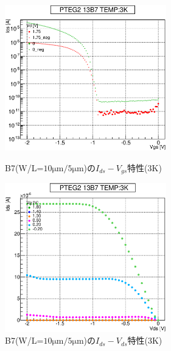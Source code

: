 				\begin{figure}[htbp]
					\begin{minipage}{0.5\hsize}
						\begin{center}
							\includegraphics[width=70mm]{./Chapter/Appendix/Picture/PBT/B7/PTEG2_13_B7_IdVg_3K.eps}
						\end{center}
						\caption{B7(W/L=$10\mathrm{\mu m}/5\mathrm{\mu m}$)の$I_{ds}-V_{gs}$特性(3K)}
						\label{fig:B7_IdVg_3K}
					\end{minipage}
					\begin{minipage}{0.5\hsize}
						\begin{center}
							\includegraphics[width=70mm]{./Chapter/Appendix/Picture/PBT/B7/PTEG2_13_B7_IdVd_3K.eps}
						\end{center}
						\caption{B7(W/L=$10\mathrm{\mu m}/5\mathrm{\mu m}$)の$I_{ds}-V_{ds}$特性(3K)}
						\label{fig:B7_IdVd_3K}
					\end{minipage}
				\end{figure}
